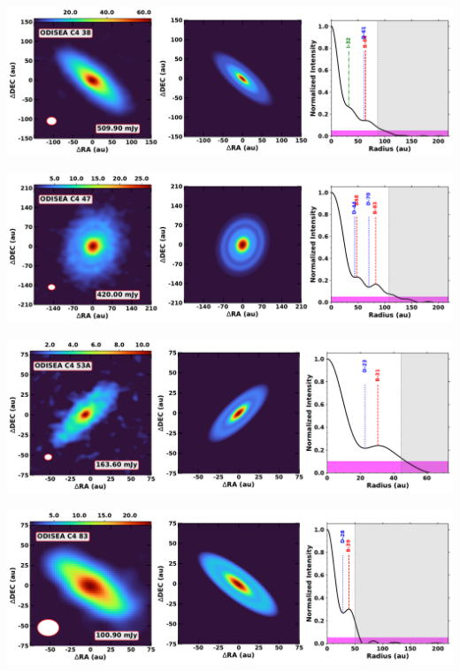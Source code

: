 \noindent
\begin{minipage}{.49\textwidth}
	 \centering
	 	 \hrulesep
	 	 \includegraphics[width=1\linewidth]{pdf/2+I_F/093_odisea_c4_38_cutout.pdf}
\end{minipage}%
\vrulesep
\begin{minipage}{.49\textwidth}
	 \centering
	 	 \hrulesep
	 	 \includegraphics[width=1\linewidth]{pdf/2+I_F/092_odisea_c4_47_cutout.pdf}
\end{minipage}%
\vspace{0pt}
\begin{minipage}{.49\textwidth}
	 \centering
	 	 \hrulesep
	 	 \includegraphics[width=1\linewidth]{pdf/2+I_F/077_odisea_c4_53a_cutout.pdf}
\end{minipage}%
\vrulesep
\begin{minipage}{.49\textwidth}
	 \centering
	 	 \hrulesep
	 	 \includegraphics[width=1\linewidth]{pdf/2+I_F/064_odisea_c4_83_cutout.pdf}
\end{minipage}%
